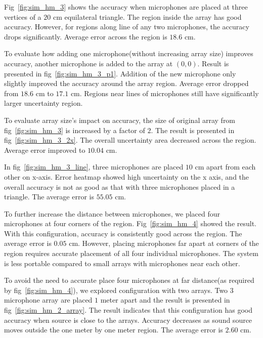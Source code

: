 Fig~\ref{fig:sim_hm_3} shows the accuracy when microphones are placed at three vertices of a $20$ cm equilateral triangle. The region inside the array has good accuracy. However, for regions along line of any two microphones, the accuracy drops significantly. Average error across the region is $18.6$ cm.

To evaluate how adding one microphone(without increasing array size) improves accuracy,  another microphone is added to the array at $(0,0)$. Result is presented in fig~\ref{fig:sim_hm_3_p1}. Addition of the new microphone only slightly improved the accuracy around the array region. Average error dropped from $18.6$ cm to $17.1$ cm. Regions near lines of microphones still have significantly larger uncertainty region.

To evaluate array size's impact on accuracy, the size of original array from fig~\ref{fig:sim_hm_3} is increased by a factor of $2$. The result is presented in fig~\ref{fig:sim_hm_3_2x}. The overall uncertainty area decreased across the region. Average error improved to $10.04$ cm. 

In fig~\ref{fig:sim_hm_3_line}, three microphones are placed $10$ cm apart from each other on x-axis. Error heatmap showed high uncertainty on the x axis, and the overall accuracy is not as good as that with three microphones placed in a triangle. The average error is $55.05$ cm. 

To further increase the distance between microphones, we placed four microphones at four corners of the region. Fig~\ref{fig:sim_hm_4} showed the result. With this configuration, accuracy is consistently good across the region. The average error is $0.05$ cm.  However, placing microphones far apart at corners of the region requires accurate placement of all four individual microphones. The system is less portable compared to small arrays with microphones near each other.

To avoid the need to accurate place four microphones at far distance(as required by fig~\ref{fig:sim_hm_4}), we explored configuration with two arrays. Two $3$ microphone array are placed $1$ meter apart and the result is presented in fig~\ref{fig:sim_hm_2_array}.  The result indicates that this configuration has good accuracy when source is close to the arrays. Accuracy decreases as sound source moves outside the one meter by one meter region. The average error is $2.60$ cm.
